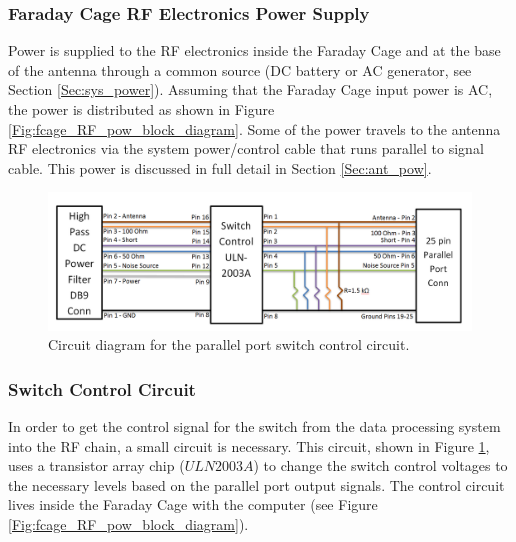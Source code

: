 \subsubsection{Faraday Cage RF Electronics Power Supply}

Power is supplied to the RF electronics inside the Faraday Cage and at the base of the antenna through a common source (DC battery or AC generator, see Section \ref{Sec:sys_power}). Assuming that the Faraday Cage input power is AC, the power is distributed as shown in Figure \ref{Fig:fcage_RF_pow_block_diagram}. Some of the power travels to the antenna RF electronics via the system power/control cable that runs parallel to signal cable. This power is discussed in full detail in Section \ref{Sec:ant_pow}. 

\begin{figure}[htb]
\begin{center}
\includegraphics[width=0.9\linewidth]{SCIHI_system/figures/fcage_pp_con_circuit_diagram.png}
\caption{Circuit diagram for the parallel port switch control circuit.}
\label{Fig:fcage_ppcon_block_diagram}
\end{center}
\end{figure}

\subsubsection{Switch Control Circuit}

In order to get the control signal for the switch from the data processing system into the RF chain, a small circuit is necessary. This circuit, shown in Figure \ref{Fig:fcage_ppcon_block_diagram}, uses a transistor array chip ($ULN2003A$) to change the switch control voltages to the necessary levels based on the parallel port output signals. The control circuit lives inside the Faraday Cage with the computer (see Figure \ref{Fig:fcage_RF_pow_block_diagram}). 

